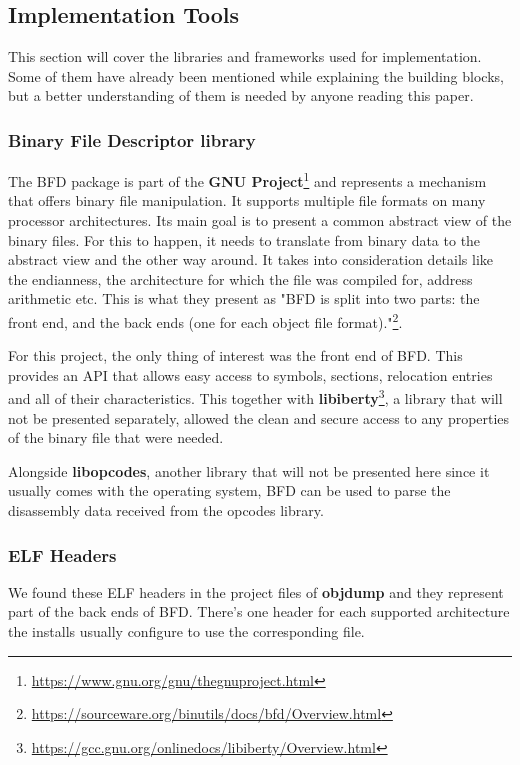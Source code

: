 \subsection{Implementation Tools}
\label{sec:imp-tools}

This section will cover the libraries and frameworks used for implementation. Some of them have already been mentioned while explaining the building blocks, but a better understanding of them is needed by anyone reading this paper.

\subsubsection{Binary File Descriptor library}
\label{sub-sec:bfd}

The BFD package is part of the \textbf{GNU Project}\footnote{\url{https://www.gnu.org/gnu/thegnuproject.html}} and represents a mechanism that offers binary file manipulation. It supports multiple file formats on many processor architectures. Its main goal is to present a common abstract view of the binary files. For this to happen, it needs to translate from binary data to the abstract view and the other way around. It takes into consideration details like the endianness, the architecture for which the file was compiled for, address arithmetic etc. This is what they present as "BFD is split into two parts: the front end, and the back ends (one for each object file format)."\footnote{\url{https://sourceware.org/binutils/docs/bfd/Overview.html}}.

For this project, the only thing of interest was the front end of BFD. This provides an API that allows easy access to symbols, sections, relocation entries and all of their characteristics. This together with \textbf{libiberty}\footnote{\url{https://gcc.gnu.org/onlinedocs/libiberty/Overview.html}}, a library that will not be presented separately, allowed the clean and secure access to any properties of the binary file that were needed.

Alongside \textbf{libopcodes}, another library that will not be presented here since it usually comes with the operating system, BFD can be used to parse the disassembly data received from the opcodes library.

\subsubsection{ELF Headers}
\label{sub-sec:elf-headers}

We found these ELF headers in the project files of \textbf{objdump} and they represent part of the back ends of BFD. There's one header for each supported architecture the installs usually configure to use the corresponding file.

